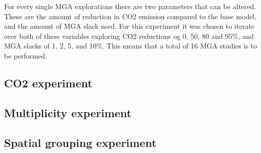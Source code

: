 For every single MGA explorations there are two parameters that can be altered. These are the amount of reduction in CO2 emission compared to the base model, and the amount of MGA slack used. For this experiment it was chosen to iterate over both of these variables exploring CO2 reductions og 0, 50, 80 and 95\%, and MGA slacks of 1, 2, 5, and 10\%. This means that a total of 16 MGA studies is to be performed. 

\subsection{CO2 experiment}

\subsection{Multiplicity experiment}

\subsection{Spatial grouping experiment}


